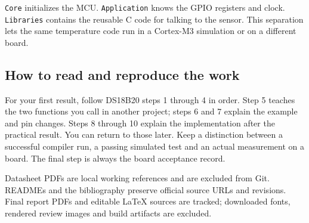 \texttt{Core} initializes the MCU. \texttt{Application} knows the GPIO registers and clock. \texttt{Libraries} contains the reusable C code for talking to the sensor. This separation lets the same temperature code run in a Cortex-M3 simulation or on a different board.

\subsection{How to read and reproduce the work}
For your first result, follow DS18B20 steps 1 through 4 in order. Step 5 teaches the two functions you call in another project; steps 6 and 7 explain the example and pin changes. Steps 8 through 10 explain the implementation after the practical result. You can return to those later. Keep a distinction between a successful compiler run, a passing simulated test and an actual measurement on a board. The final step is always the board acceptance record.

Datasheet PDFs are local working references and are excluded from Git. READMEs and the bibliography preserve official source URLs and revisions. Final report PDFs and editable LaTeX sources are tracked; downloaded fonts, rendered review images and build artifacts are excluded.
